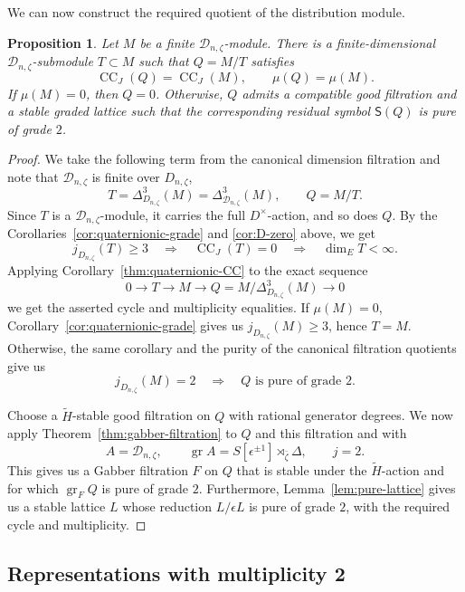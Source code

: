 \documentclass[11pt]{article}
\newtheorem{proposition}[theorem]{Proposition}
\theoremstyle{definition}
\newcommand{\gr}{\operatorname{gr}}
\newcommand{\CC}{\operatorname{CC}}
\begin{document}
We can now construct the required quotient of the distribution module.

\begin{proposition}
\label{prop:analytic-purification}
Let $M$ be a finite $\mathscr D_{n,\zeta}$-module.
There is a finite-dimensional $\mathscr D_{n,\zeta}$-submodule
$T\subset M$ such that $Q=M/T$ satisfies
\[
 \CC_J(Q)=\CC_J(M),\qquad
 \mu(Q)=\mu(M).
\]
If $\mu(M)=0$, then $Q=0$. Otherwise, $Q$ admits
a compatible good filtration and a stable graded lattice such that the corresponding
residual symbol $\mathsf S(Q)$ is pure of grade $2$.
\end{proposition}
\begin{proof}
We take the following term from the canonical dimension filtration and note that $\mathscr{D}_{n, \zeta}$ is finite over $D_{n,\zeta}$,
\[
 T=\Delta_{D_{n,\zeta}}^3(M)=\Delta_{\mathscr{D}_{n,\zeta}}^3(M),
 \qquad Q=M/T.
\]
Since $T$ is a $\mathscr{D}_{n, \zeta}$-module, it carries the full $D^\times$-action, and so does $Q$. By the Corollaries~\ref{cor:quaternionic-grade} and \ref{cor:D-zero} above, we get
\[
 j_{D_{n,\zeta}}(T)\geq3
 \quad\Rightarrow\quad \CC_J(T)=0
 \quad\Rightarrow\quad \dim_E T<\infty.
\]
Applying Corollary~\ref{thm:quaternionic-CC} to the exact sequence
\[
 0\longrightarrow T\longrightarrow M\longrightarrow Q=M/\Delta^3_{D_{n,\zeta}}(M)
 \longrightarrow0
\]
we get the asserted cycle and multiplicity equalities.
If $\mu(M)=0$, Corollary~\ref{cor:quaternionic-grade}
gives us $j_{D_{n,\zeta}}(M)\geq3$, hence $T=M$.
Otherwise, the same corollary and the purity of the canonical
filtration quotients give us
\[
 j_{D_{n,\zeta}}(M)=2
 \quad\Rightarrow\quad Q\text{ is pure of grade }2.
\]

Choose a $\widetilde H$-stable good filtration on $Q$ with
rational generator degrees.
We now apply Theorem~\ref{thm:gabber-filtration} to $Q$ and this filtration and with
\[
 A=\mathscr D_{n,\zeta},\qquad \gr A=S[\epsilon^{\pm1}]\rtimes_{\bar{\zeta}}\Delta,\qquad j=2.
\]
This gives us a Gabber filtration $F$ on $Q$ that is stable under the $\widetilde{H}$-action and for which $\gr_FQ$ is pure of grade $2$.
Furthermore, Lemma~\ref{lem:pure-lattice} gives us a stable lattice $L$
whose reduction $L/\epsilon L$ is pure of grade $2$, with the required cycle and multiplicity.
\end{proof}

\subsection{Representations with multiplicity 2}
\end{document}
